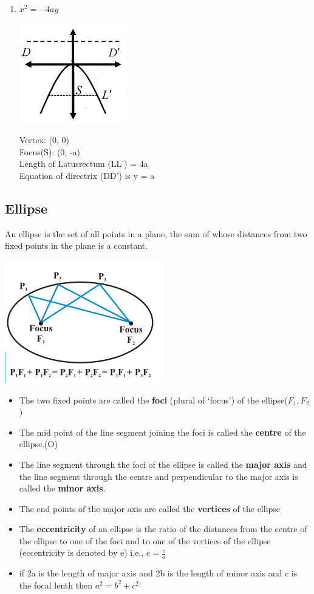 \documentclass[12pt]{article}
\begin{document}
\begin{multicols}{2}
\begin{enumerate}
\item $x^2 = -4ay$ \begin{center}
    \includegraphics*[scale =0.8]{4.png}
\end{center}
Vertex: (0, 0)\\
Focus(S): (0, -a)\\
Length of Latusrectum (LL’) = 4a\\
Equation of directrix (DD’) is y = a
\end{enumerate}

\subsection*{Ellipse}
An ellipse is the set of all points in
a plane, the sum of whose distances from two
fixed points in the plane is a constant.


\begin{center}
    \includegraphics*[scale=0.5]{f2.png}
\end{center}
\begin{itemize}
    \item The two fixed points are called the \textbf{foci} (plural
    of ‘focus’) of the ellipse($F_1,F_2$)
    \item The mid point of the line segment joining the foci is called the \textbf{centre} of the
    ellipse.(O)
    \item  The line segment through the foci of the ellipse is called the \textbf{major axis} and the
    line segment through the centre and perpendicular to the major axis is called the \textbf{minor
    axis}.
    \item The end points of the major axis are called the \textbf{vertices} of the ellipse
    \item The \textbf{eccentricity} of an ellipse is the ratio of the distances from the centre
    of the ellipse to one of the foci and to one of the vertices of the ellipse (eccentricity is
    denoted by e) i.e., $e=\frac{c}{a}$
    \item if 2a is the length of major axis and 2b is the length of minor axis and c is the focal lenth then $a^2=b^2+c^2$
\end{itemize}


\end{multicols}
\end{document}

